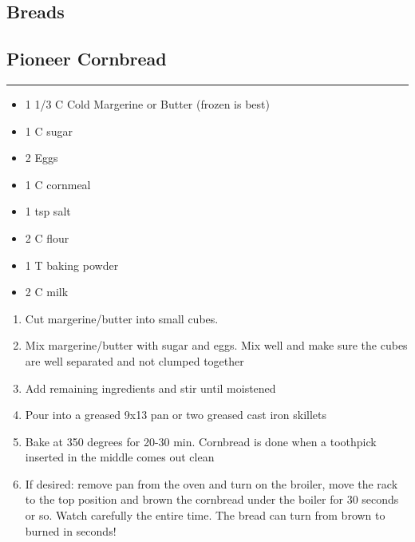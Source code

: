 \documentclass{article}
\begin{document}
\vspace*{\fill}
\begin{center}
    \section{Breads}
\end{center}
\vspace*{\fill}
\newpage

\subsection{Pioneer Cornbread} 
\noindent\rule[0.5ex]{\linewidth}{1pt}

\begin{framed}
    \begin{itemize}
        \item 1 1/3 C Cold Margerine or Butter (frozen is best)
        \item 1 C sugar
        \item 2 Eggs
        \item 1 C cornmeal
        \item 1 tsp salt
        \item 2 C flour
        \item 1 T baking powder
        \item 2 C milk
    \end{itemize}
\end{framed}


\begin{enumerate}
    \item 
        Cut margerine/butter into small cubes.
    \item 
        Mix margerine/butter with sugar and eggs. Mix well and make sure the cubes are well separated and not clumped together
    \item 
        Add remaining ingredients and stir until moistened
    \item 
        Pour into a greased 9x13 pan or two greased cast iron skillets
    \item 
        Bake at 350 degrees for 20-30 min. Cornbread is done when a toothpick inserted in the middle comes out clean
    \item 
        If desired: remove pan from the oven and turn on the broiler, move the rack to the top position and brown the cornbread under the boiler for 30 seconds or so.  Watch carefully the entire time.  The bread can turn from brown to burned in seconds!
\end{enumerate}
\newpage
\end{document}

